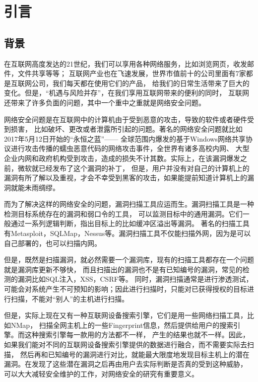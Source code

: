 \chapter{引言}
\label{cha:intro}

\section{背景}
在互联网高度发达的21世纪，我们可以享用各种网络服务，比如浏览网页，收发邮件，文件共享等等；
互联网产业也在飞速发展，世界市值前十的公司里面有7家都是互联网公司，我们每天都在使用它们的产品，
给我们的日常生活带来了巨大的变化。但是，“机遇与风险并存”，在我们享用互联网带来的便利的同时，
互联网还带来了许多负面的问题，其中一个重中之重就是网络安全问题。

网络安全问题是在互联网中的计算机由于受到恶意的攻击，导致的软件或者硬件受到损害，
比如破坏、更改或者泄露所引起的问题。著名的网络安全问题就比如2017年5月12日开始的“永恒之蓝”\cite{ehrenfeld2017wannacry}——
全球范围内爆发的基于Windows网络共享协议进行攻击传播的蠕虫恶意代码的网络攻击事件，全世界有诸多高校内网、
大型企业内网和政府机构受到攻击，造成的损失不计其数。实际上，在该漏洞爆发之前，微软就已经发布了这个漏洞的补丁，
但是，用户并没有对自己的计算机上的漏洞有所了解以及重视，才会不幸受到黑客的攻击，如果能提前知道计算机上的漏洞就能未雨绸缪。

而为了解决这样的网络安全的问题，漏洞扫描工具应运而生。漏洞扫描工具是一种检测目标系统存在的漏洞和弱口令的工具，
可以监测目标中的通用漏洞。它们一般通过一系列逻辑判断，指出目标上的比如缓冲区溢出等漏洞。
著名的扫描工具有Metasploit\cite{o2011metasploit}，SQLMap\cite{damele2012sqlmap}，Nessus\cite{thacker2006probabilistic}等。漏洞扫描工具不仅能扫描外网，因为是可以自己部署的，也可以扫描内网。

但是，既然是扫描漏洞，就必然需要一个漏洞库，现有的扫描工具都存在一个问题就是漏洞库更新不够快，
而且扫描出的漏洞也不是有已知编号的漏洞，常见的检测的漏洞比如SQL注入，XSS，CSRF等。
同时，漏洞扫描通常是进行渗透测试，可能会对系统产生不可预知的影响；因此进行扫描时，只能对已获得授权的目标进行扫描，不能对“别人”的主机进行扫描。

但是，实际上现在又有一种互联网设备搜索引擎，它们是用一些网络扫描工具，比如NMap\cite{lyon2009nmap}，
扫描全网主机上的一些Fingerprint信息，然后提供给用户的搜索引擎。而这种搜索引擎每一款用的方法都不一样，
产生的结果也就不一样。因此，如果我们能对不同的互联网设备搜索引擎提供的数据进行融合，而不需要实际去扫描，
然后再和已知编号的漏洞进行对比，就能最大限度地发现目标主机上的潜在漏洞。在发现了这些潜在漏洞之后再由用户去实际判断是否真的受到这种威胁，
可以大大减轻安全维护的工作，对网络安全的研究有重要意义。


